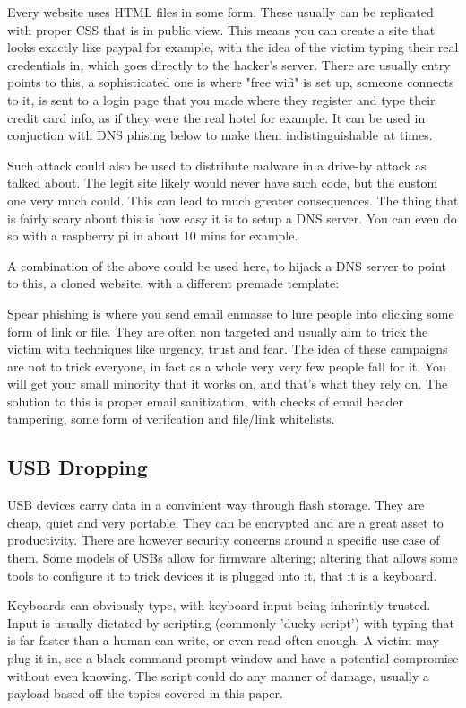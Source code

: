 Every website uses HTML files in some form. These usually can be replicated with proper CSS that is in public view. This means you can create a site that looks exactly like paypal for example, with the idea of the victim typing their real credentials in, 
which goes directly to the hacker's server. There are usually entry points to this, a sophisticated one is where "free wifi" is set up, someone connects to it, is sent to a login page that you made where they register and type their credit card info, 
as if they were the real hotel for example. It can be used in conjuction with DNS phising below to make them indistinguishable at times.

Such attack could also be used to distribute malware in a drive-by attack as talked about. The legit site likely would never have such code, but the custom one very much could. This can lead to much greater consequences. The thing that is fairly scary about this is how easy it is to setup a DNS server. You can even do so with a raspberry pi in about 10 mins for example.

A combination of the above could be used here, to hijack a DNS server to point to this, a cloned website, with a different premade template:

Spear phishing is where you send email enmasse to lure people into clicking some form of link or file. They are often non targeted and usually aim to trick the victim with techniques like urgency, trust and fear. The idea of these campaigns are not to trick everyone, 
in fact as a whole very very few people fall for it. You will get your small minority that it works on, and that's what they rely on. The solution to this is proper email sanitization, with checks of email header tampering, some form of verifcation and file/link whitelists.

\subsection{USB Dropping}
USB devices carry data in a convinient way through flash storage. They are cheap, quiet and very portable. They can be encrypted and are a great asset to productivity. 
There are however security concerns around a specific use case of them. Some models of USBs allow for firmware altering; altering that allows some tools to configure it to trick
devices it is plugged into it, that it is a keyboard. 

Keyboards can obviously type, with keyboard input being inherintly trusted. Input is usually dictated by scripting (commonly 'ducky script')
with typing that is far faster than a human can write, or even read often enough. A victim may plug it in, see a black command prompt window and have a potential compromise without even knowing. 
The script could do any manner of damage, usually a payload based off the topics covered in this paper. 

